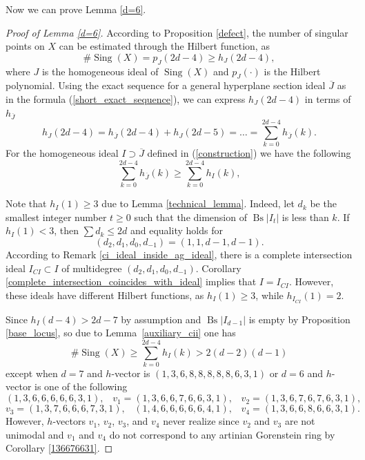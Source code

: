 \documentclass[a4paper,11pt,english,german]{amsart}
\DeclareMathOperator{\Sing}{Sing}
\DeclareMathOperator{\Bs}{Bs}
\theoremstyle{definition}
\begin{document}
Now we can prove Lemma \ref{d=6}.
\begin{proof}[Proof of Lemma \ref{d=6}]
	According to Proposition \ref{defect}, the number of singular points on $X$ can be estimated through the Hilbert function, as
	\[ \#\Sing(X)=p_J(2d-4) \geqslant h_J(2d-4),\]
	where $J$ is the homogeneous ideal of $\Sing(X)$ and $p_J(\cdot)$ is the Hilbert polynomial. Using the exact sequence for a general hyperplane section ideal $\overline{J}$ as in the formula (\ref{short_exact_sequence}), we can express $h_J(2d-4)$ in terms of $h_{\overline{J}}$
	\begin{equation*}
		h_J(2d-4)=h_{\overline{J}}(2d-4)+h_J(2d-5)=\dots=\sum\limits_{k=0}^{2d-4}h_{\overline{J}}(k).
	\end{equation*}
	For  the homogeneous ideal $I\supset \overline{J}$ defined in (\ref{construction}) we have the following	
	\begin{equation*}
		\sum\limits_{k=0}^{2d-4}h_{\overline{J}}(k)\geqslant \sum\limits_{k=0}^{2d-4}h_I(k),
	\end{equation*}
	
Note that $h_I(1)\geqslant 3$ due to Lemma \ref{technical_lemma}. Indeed, let $d_k$ be the smallest integer number $t\geqslant 0$ such that the dimension of $\Bs|I_t|$ is less than $k$. If $h_I(1) < 3$, then $\sum d_k\leqslant 2d$ and equality holds for 
$$(d_2,d_1,d_0,d_{-1})=(1,1,d-1,d-1).$$
According to Remark \ref{ci_ideal_inside_ag_ideal}, there is a complete intersection ideal $I_{CI}\subset I$ of multidegree $(d_2,d_1,d_0,d_{-1})$. Corollary \ref{complete_intersection_coincides_with_ideal} implies that $I=I_{CI}$. However, these ideals have different Hilbert functions, as \mbox{$h_I(1)\geqslant 3$}, while $h_{I_{CI}}(1)=2$. 


	Since $h_I(d-4)>2d-7$ by assumption and $\Bs|I_{d-1}|$ is empty by Proposition \ref{base_locus}, so due to Lemma~\ref{auxiliary_cii} one has 
\begin{equation}\label{inequality_final}
		\#\Sing(X)\geqslant \sum\limits_{k=0}^{2d-4} h_I(k)>2(d-2)(d-1)\tag{5.2}
	\end{equation}
	except when $d=7$ and $h$-vector is $(1,3,6,8,8,8,8,8,6,3,1)$ or $d=6$ and $h$-vector is one of the following
		$$(1,3,6,6,6,6,6,3,1),\hspace{10pt} v_1=(1,3,6,6,7,6,6,3,1), \hspace{10pt}v_2=(1,3,6,7,6,7,6,3,1), $$
		 $$v_3=(1,3,7,6,6,6,7,3,1), \hspace{10pt} (1,4,6,6,6,6,6,4,1), \hspace{10pt} v_4=(1,3,6,6,8,6,6,3,1).$$
However, $h$-vectors $v_1$, $v_2$, $v_3$, and $v_4$ never realize since $v_2$ and $v_3$ are not unimodal and $v_1$ and $v_4$ do not correspond to any artinian Gorenstein ring by Corollary \ref{136676631}.		 


\end{proof}
\end{document}
